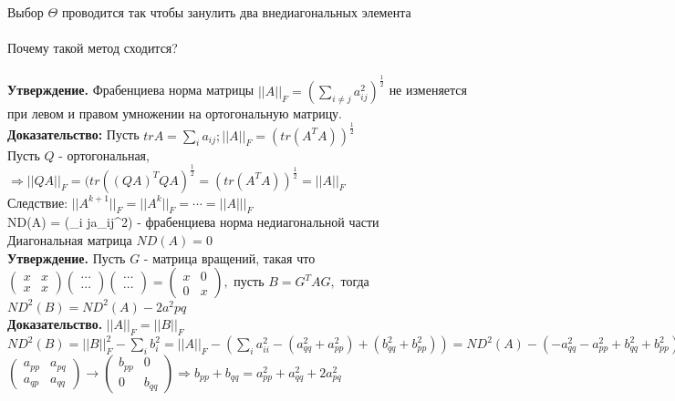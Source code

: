     Выбор $\Theta$ проводится так чтобы занулить два внедиагональных элемента\\ \\ 
    Почему такой метод сходится?\\ \\ 
\textbf{Утверждение.} Фрабенциева норма матрицы \(||A||_F = (\sum_{i \neq j}a_{ij}^2)^{\frac{1}{2}}\) не изменяется при левом и правом умножении на ортогональную матрицу. \\
    
    \textbf{Доказательство:} Пусть \(tr A = \sum_ia_{ij}; ||A||_F = (tr(A^TA))^{\frac{1}{2}}\) \\
    Пусть \(Q\) - ортогональная, \(\Rightarrow ||QA||_F=(tr((QA)^TQA)^{\frac{1}{2}} = (tr(A^TA))^{\frac{1}{2}} = ||A||_F\) \\
    Следствие: \(||A^{k+1}||_F=||A^k||_F=\cdots=||A|||_F\) \\
    ND(A) = (\sum_{i \neq j}a_{ij}^2) - фрабенциева норма недиагональной части \\
    Диагональная матрица \(ND(A) = 0\) \\

    \textbf{Утверждение.} Пусть \(G\) - матрица вращений, такая что \(
    \begin{pmatrix}
      x & x \\ x & x   
    \end{pmatrix} 
    \begin{pmatrix}
        \cdots \\ \cdots
    \end{pmatrix}
    \begin{pmatrix}
        \cdots \\ \cdots
    \end{pmatrix} = 
    \begin{pmatrix}
      x & 0 \\ 0 & x   
    \end{pmatrix}, 
    \) пусть \(B = G^TAG,\) тогда \(ND^2(B) = ND^2(A) - 2a^2pq\) \\

    \textbf{Доказательство.} \(||A||_F = ||B||_F\)\\
    \(ND^2(B)=||B||_F^2-\sum_ib_i^2=||A||_F-(\sum_ia_{ii}^2 - (a_{qq}^2 + a_{pp}^2) + (b_{qq}^2 + b_{pp}^2)) = ND^2(A) - (-a_{qq}^2 - a_{pp}^2 + b_{qq}^2 + b_{pp}^2)\) \\
    \(\begin{pmatrix}
        a_{pp} & a_{pq} \\
        a_{qp} & a_{qq}
    \end{pmatrix} \rightarrow \begin{pmatrix}
        b_{pp} & 0 \\
        0 & b_{qq}
    \end{pmatrix}  \Rightarrow b_{pp} + b_{qq}=a^2_{pp} + a^2_{qq} + 2a_{pq}^2\) \\

